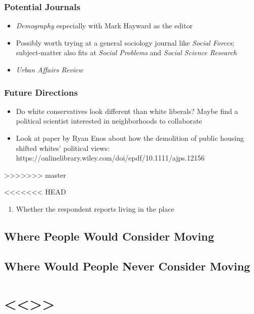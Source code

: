 \documentclass{baderart}
\providecommand{\tightlist}{%
  \setlength{\itemsep}{0pt}\setlength{\parskip}{0pt}}
\begin{document}
\subsubsection{Potential Journals}\label{potential-journals}

\begin{itemize} \tightlist \item   \emph{Demography} especially with Mark Hayward as the editor \item   Possibly worth trying at a general sociology journal like \emph{Social   Forces}; subject-matter also fits at \emph{Social Problems} and   \emph{Social Science Research} \item   \emph{Urban Affairs Review} \end{itemize}

\subsubsection{Future Directions}\label{future-directions}

\begin{itemize} \tightlist \item   Do white conservatives look different than white liberals? Maybe find   a political scientist interested in neighborhoods to collaborate \item   Look at paper by Ryan Enos about how the demolition of public housing   shifted whites' political views:   https://onlinelibrary.wiley.com/doi/epdf/10.1111/ajps.12156 \end{itemize}
>>>>>>> master


<<<<<<< HEAD
\begin{enumerate}
\def\labelenumi{\arabic{enumi}.}
\tightlist
\item
  Whether the respondent reports living in the place
\end{enumerate}

\subsection{Where People Would Consider
Moving}\label{where-people-would-consider-moving}

\subsection{Where Would People Never Consider
Moving}\label{where-would-people-never-consider-moving}

\section{\textless{}\textless{}\textgreater{}\textgreater{}}\label{section-4}
\end{document}
